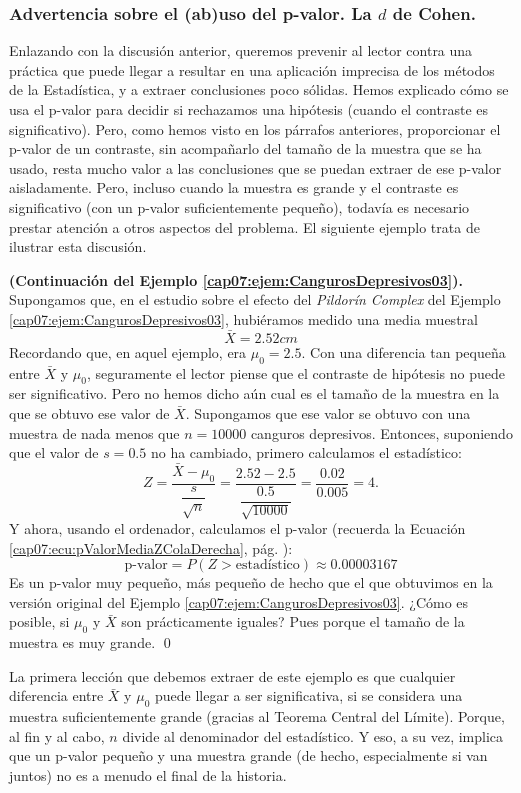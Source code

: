 \subsubsection*{Advertencia sobre el (ab)uso del p-valor. La $d$ de Cohen.}
\label{cap07:subsubsec:AdvertenciaAbusoPValor}

Enlazando con la discusión anterior, queremos prevenir al lector contra una práctica que puede llegar a resultar en una aplicación imprecisa de los métodos de la Estadística, y a extraer conclusiones poco sólidas. Hemos explicado cómo se usa el p-valor para decidir si rechazamos una hipótesis (cuando el contraste es significativo). Pero, como hemos visto en los párrafos anteriores, proporcionar el p-valor de un contraste, sin acompañarlo del tamaño de la muestra que se ha usado, resta mucho valor a las conclusiones que se puedan extraer de ese p-valor aisladamente.
Pero, incluso cuando la muestra es grande y el contraste es significativo (con un p-valor suficientemente pequeño), todavía es necesario prestar atención a otros aspectos del problema. El siguiente ejemplo trata de ilustrar esta discusión.
\begin{ejemplo}{\bf (Continuación del Ejemplo \ref{cap07:ejem:CangurosDepresivos03}).}
\label{cap07:ejem:AbusoPValor}
Supongamos que, en el estudio sobre el efecto del {\em Pildorín Complex} del Ejemplo \ref{cap07:ejem:CangurosDepresivos03}, hubiéramos medido una media muestral
\[\bar X=2.52 cm\]
Recordando que, en aquel ejemplo, era $\mu_0=2.5$. Con una diferencia tan pequeña entre $\bar X$ y $\mu_0$, seguramente el lector piense que el contraste de hipótesis no puede ser significativo. Pero no hemos dicho aún cual es el tamaño de la muestra en la que se obtuvo ese valor de $\bar X$. Supongamos que ese valor se obtuvo con una muestra de nada menos que $n=10000$ canguros depresivos. Entonces, suponiendo que el valor de $s=0.5$ no ha cambiado, primero calculamos el estadístico:
        \[
         Z=\dfrac{\bar X-\mu_0}{\dfrac{s}{\sqrt{n}}}=
         \dfrac{2.52-2.5}{\dfrac{0.5}{\sqrt{10000}}}=\dfrac{0.02}{0.005}=4.
         \]
Y ahora, usando el ordenador, calculamos el p-valor (recuerda la Ecuación \ref{cap07:ecu:pValorMediaZColaDerecha}, pág. \pageref{cap07:ecu:pValorMediaZColaDerecha}):
\[\mbox{p-valor}=P\left(Z > \mbox{estadístico}\right)\approx 0.00003167\]
Es un p-valor muy pequeño, más pequeño de hecho que el que obtuvimos en la versión original del Ejemplo \ref{cap07:ejem:CangurosDepresivos03}. ¿Cómo es posible, si $\mu_0$ y $\bar X$ son prácticamente iguales? Pues porque el tamaño de la muestra es muy grande.
\qed
\end{ejemplo}
La primera lección que debemos extraer de este ejemplo es que cualquier diferencia entre $\bar X$ y $\mu_0$ puede llegar a ser significativa, si se considera una muestra suficientemente grande (gracias al Teorema Central del Límite). Porque, al fin y al cabo, $n$ divide al denominador del estadístico.
Y eso, a su vez, implica que un p-valor pequeño y una muestra grande (de hecho, especialmente si van juntos) no es a menudo el final de la historia.


